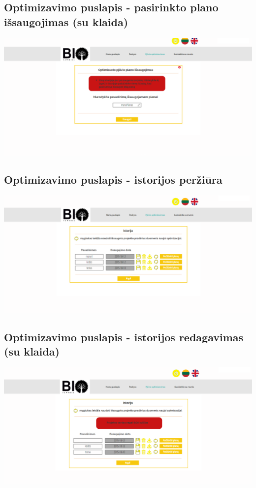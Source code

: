 \documentclass[a4paper,12pt]{article}
\begin{document}
\subsection{Optimizavimo puslapis - pasirinkto plano išsaugojimas (su klaida)}
\hspace{-2cm}
\includegraphics[scale=0.5]{interfeisai/optimizavimoPuslapisPrisijungusPasirinktoPlanoIsaugojimasSuKlaida}

\subsection{Optimizavimo puslapis - istorijos peržiūra}
\hspace{-2cm}
\includegraphics[scale=0.5]{interfeisai/optimizavimoPuslapisPrisijungusIstorija}

\subsection{Optimizavimo puslapis - istorijos redagavimas (su klaida)}
\hspace{-2cm}
\includegraphics[scale=0.5]{interfeisai/optimizavimoPuslapisPrisijungusIstorijaSuKlaida}
\end{document}
